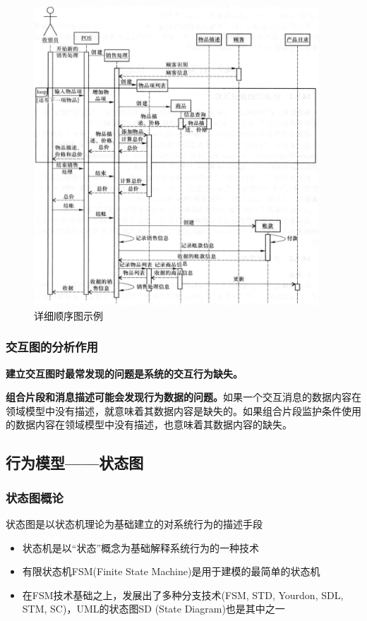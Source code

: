 \begin{figure}[H]
	\centering
    \vspace{-0.2em}
	\includegraphics[width=0.95\textwidth]{img/详细顺序图示例.png}
    \caption*{详细顺序图示例}
    \vspace{-1em}
\end{figure}


\subsubsection{交互图的分析作用}
\textbf{建立交互图时最常发现的问题是系统的交互行为缺失。}

\textbf{组合片段和消息描述可能会发现行为数据的问题。}如果一个交互消息的数据内容在领域模型中没有描述，就意味着其数据内容是缺失的。如果组合片段监护条件使用的数据内容在领域模型中没有描述，也意味着其数据内容的缺失。


\subsection{行为模型——状态图}

\subsubsection{状态图概论}
状态图是以状态机理论为基础建立的对系统行为的描述手段
\begin{itemize}
    \item 状态机是以“状态”概念为基础解释系统行为的一种技术
    \item 有限状态机FSM(Finite State Machine)是用于建模的最简单的状态机
    \item 在FSM技术基础之上，发展出了多种分支技术(FSM, STD, Yourdon, SDL, STM, SC)，UML的状态图SD (State Diagram)也是其中之一
\end{itemize}

